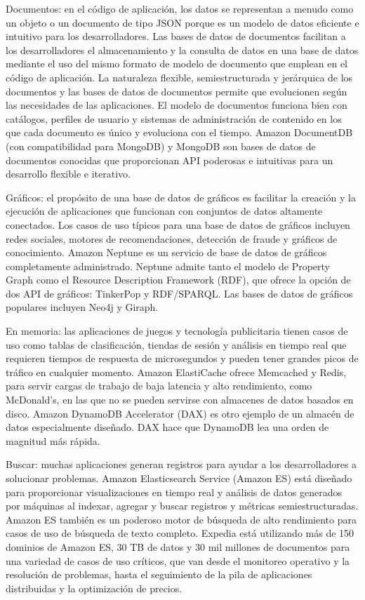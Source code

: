 \documentclass[twoside,twocolumn]{article}
\begin{document}
Documentos: en el código de aplicación, los datos se representan a menudo como un objeto o un documento de tipo JSON porque es un modelo de datos eficiente e intuitivo para los desarrolladores. Las bases de datos de documentos facilitan a los desarrolladores el almacenamiento y la consulta de datos en una base de datos mediante el uso del mismo formato de modelo de documento que emplean en el código de aplicación. La naturaleza flexible, semiestructurada y jerárquica de los documentos y las bases de datos de documentos permite que evolucionen según las necesidades de las aplicaciones. El modelo de documentos funciona bien con catálogos, perfiles de usuario y sistemas de administración de contenido en los que cada documento es único y evoluciona con el tiempo. Amazon DocumentDB (con compatibilidad para MongoDB) y MongoDB son bases de datos de documentos conocidas que proporcionan API poderosas e intuitivas para un desarrollo flexible e iterativo.

Gráficos: el propósito de una base de datos de gráficos es facilitar la creación y la ejecución de aplicaciones que funcionan con conjuntos de datos altamente conectados. Los casos de uso típicos para una base de datos de gráficos incluyen redes sociales, motores de recomendaciones, detección de fraude y gráficos de conocimiento. Amazon Neptune es un servicio de base de datos de gráficos completamente administrado. Neptune admite tanto el modelo de Property Graph como el Resource Description Framework (RDF), que ofrece la opción de dos API de gráficos: TinkerPop y RDF/SPARQL. Las bases de datos de gráficos populares incluyen Neo4j y Giraph.

En memoria: las aplicaciones de juegos y tecnología publicitaria tienen casos de uso como tablas de clasificación, tiendas de sesión y análisis en tiempo real que requieren tiempos de respuesta de microsegundos y pueden tener grandes picos de tráfico en cualquier momento. Amazon ElastiCache ofrece Memcached y Redis, para servir cargas de trabajo de baja latencia y alto rendimiento, como McDonald’s, en las que no se pueden servirse con almacenes de datos basados en disco. Amazon DynamoDB Accelerator (DAX) es otro ejemplo de un almacén de datos especialmente diseñado. DAX hace que DynamoDB lea una orden de magnitud más rápida.

Buscar: muchas aplicaciones generan registros para ayudar a los desarrolladores a solucionar problemas. Amazon Elasticsearch Service (Amazon ES) está diseñado para proporcionar visualizaciones en tiempo real y análisis de datos generados por máquinas al indexar, agregar y buscar registros y métricas semiestructuradas. Amazon ES también es un poderoso motor de búsqueda de alto rendimiento para casos de uso de búsqueda de texto completo. Expedia está utilizando más de 150 dominios de Amazon ES, 30 TB de datos y 30 mil millones de documentos para una variedad de casos de uso críticos, que van desde el monitoreo operativo y la resolución de problemas, hasta el seguimiento de la pila de aplicaciones distribuidas y la optimización de precios.
\end{document}
